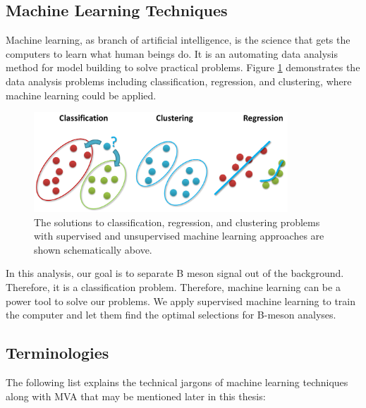 \subsection{Machine Learning Techniques}

Machine learning, as branch of artificial intelligence, is the science that gets the computers to learn what human beings do. It is an automating data analysis method for model building to solve practical problems. Figure \ref{MLProblem} demonstrates the data analysis problems including classification, regression, and clustering, where machine learning could be applied.

\begin{figure}[h]
\begin{center}
\includegraphics[width= 0.85\textwidth]{Figures/Chapter5/MLProblemsNew.png}
\caption{The solutions to classification, regression, and clustering problems with supervised and unsupervised machine learning approaches are shown schematically above.}
\label{MLProblem}
\end{center}
\end{figure}

In this analysis, our goal is to separate B meson signal out of the background. Therefore, it is a classification problem. Therefore, machine learning can be a power tool to solve our problems. We apply supervised machine learning to train the computer and let them find the optimal selections for B-meson analyses.   


\subsection{Terminologies}

The following list explains the technical jargons of machine learning techniques along with MVA that may be mentioned later in this thesis:


